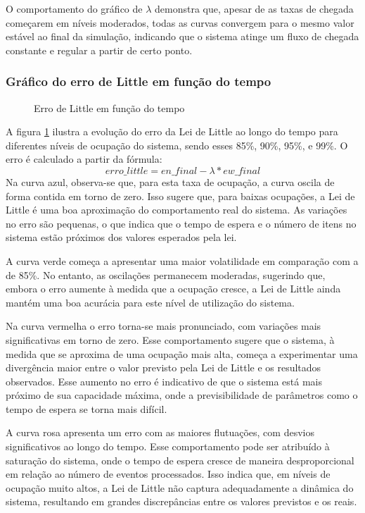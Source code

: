 O comportamento do gráfico de $\lambda$ demonstra que, apesar de as taxas de chegada começarem em níveis moderados, todas as curvas convergem para o mesmo valor estável ao final da simulação, indicando que o sistema atinge um fluxo de chegada constante e regular a partir de certo ponto.
\subsubsection{Gráfico do erro de Little em função do tempo}
\begin{figure}[h!]
   \centering
   
   \caption{Erro de Little em função do tempo}
   \label{fig:little}
\end{figure}

A figura \ref{fig:little} ilustra a evolução do erro da Lei de Little ao longo do tempo para diferentes níveis de ocupação do sistema, sendo esses 85\%, 90\%, 95\%, e 99\%. O erro é calculado a partir da fórmula:
$$
erro\_little=en\_final − \lambda * ew\_final
$$
Na curva azul, observa-se que, para esta taxa de ocupação, a curva oscila de forma contida em torno de zero. Isso sugere que, para baixas ocupações, a Lei de Little é uma boa aproximação do comportamento real do sistema. As variações no erro são pequenas, o que indica que o tempo de espera e o número de itens no sistema estão próximos dos valores esperados pela lei.

A curva verde começa a apresentar uma maior volatilidade em comparação com a de 85\%. No entanto, as oscilações permanecem moderadas, sugerindo que, embora o erro aumente à medida que a ocupação cresce, a Lei de Little ainda mantém uma boa acurácia para este nível de utilização do sistema.

Na curva vermelha o erro torna-se mais pronunciado, com variações mais significativas em torno de zero. Esse comportamento sugere que o sistema, à medida que se aproxima de uma ocupação mais alta, começa a experimentar uma divergência maior entre o valor previsto pela Lei de Little e os resultados observados. Esse aumento no erro é indicativo de que o sistema está mais próximo de sua capacidade máxima, onde a previsibilidade de parâmetros como o tempo de espera se torna mais difícil.

A curva rosa apresenta um erro com as maiores flutuações, com desvios significativos ao longo do tempo. Esse comportamento pode ser atribuído à saturação do sistema, onde o tempo de espera cresce de maneira desproporcional em relação ao número de eventos processados. Isso indica que, em níveis de ocupação muito altos, a Lei de Little não captura adequadamente a dinâmica do sistema, resultando em grandes discrepâncias entre os valores previstos e os reais.